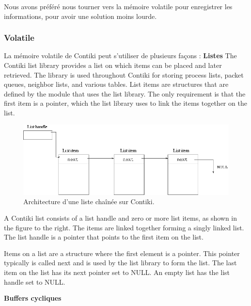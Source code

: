 			Nous avons préféré nous tourner vers la mémoire volatile pour enregistrer les informations, pour avoir une solution moins lourde.
		\subsubsection{Volatile}
			
			La mémoire volatile de Contiki peut s'utiliser de plusieurs façons :
			\textbf{Listes}
				The Contiki list library provides a list on which items can be placed and later retrieved. The library is used throughout Contiki for storing process lists, packet queues, neighbor lists, and various tables. List items are structures that are defined by the module that uses the list library. The only requirement is that the first item is a pointer, which the list library uses to link the items together on the list. 
				\begin{figure}[htp]
					\centering
					\includegraphics[width=16cm]{images/linked-list}
					\caption{Architecture d'une liste chaînée sur Contiki.}
					\label{fig:list}
				\end{figure}
				A Contiki list consists of a list handle and zero or more list items, as shown in the figure to the right. The items are linked together forming a singly linked list. The list handle is a pointer that points to the first item on the list.
				
				Items on a list are a structure where the first element is a pointer. This pointer typically is called next and is used by the list library to form the list. The last item on the list has its next pointer set to NULL. An empty list has the list handle set to NULL. 
				
			\textbf{Buffers cycliques}

